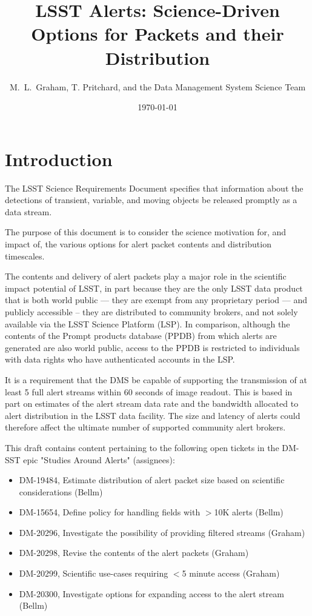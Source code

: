 \documentclass[DM,lsstdraft,authoryear,toc]{lsstdoc}
\title[Alerts Menu]{LSST Alerts: Science-Driven Options for Packets and their Distribution}
\author{%
M.~L.~Graham, T. Pritchard, and the Data Management System Science Team
}
\date{\today}
\begin{document}
\maketitle

\section{Introduction} \label{sec:intro}

The LSST Science Requirements Document  specifies that information about the detections of transient, variable, and moving objects be released promptly as a data stream.

The purpose of this document is to consider the science motivation for, and impact of, the various options for alert packet contents and distribution timescales. 

The contents and delivery of alert packets play a major role in the scientific impact potential of LSST, in part because they are the only LSST data product that is both world public --- they are exempt from any proprietary period --- and publicly accessible -- they are distributed to community brokers, and not solely available via the LSST Science Platform (LSP). In comparison, although the contents of the Prompt products database (PPDB) from which alerts are generated are also world public, access to the PPDB is restricted to individuals with data rights  who have authenticated accounts in the LSP.

It is a requirement that the DMS be capable of supporting the transmission of at least 5 full alert streams within 60 seconds of image readout. This is based in part on estimates of the alert stream data rate and the bandwidth allocated to alert distribution in the LSST data facility. The size and latency of alerts could therefore affect the ultimate number of supported community alert brokers. 

This draft contains content pertaining to the following open tickets in the DM-SST epic "Studies Around Alerts" (assignees):
\begin{itemize}
\item DM-19484, Estimate distribution of alert packet size based on scientific considerations (Bellm)
\item DM-15654, Define policy for handling fields with $>$10K alerts (Bellm)
\item DM-20296, Investigate the possibility of providing filtered streams (Graham)
\item DM-20298, Revise the contents of the alert packets (Graham)
\item DM-20299, Scientific use-cases requiring $<$5 minute access (Graham)
\item DM-20300, Investigate options for expanding access to the alert stream (Bellm)
\end{itemize}
\end{document}
